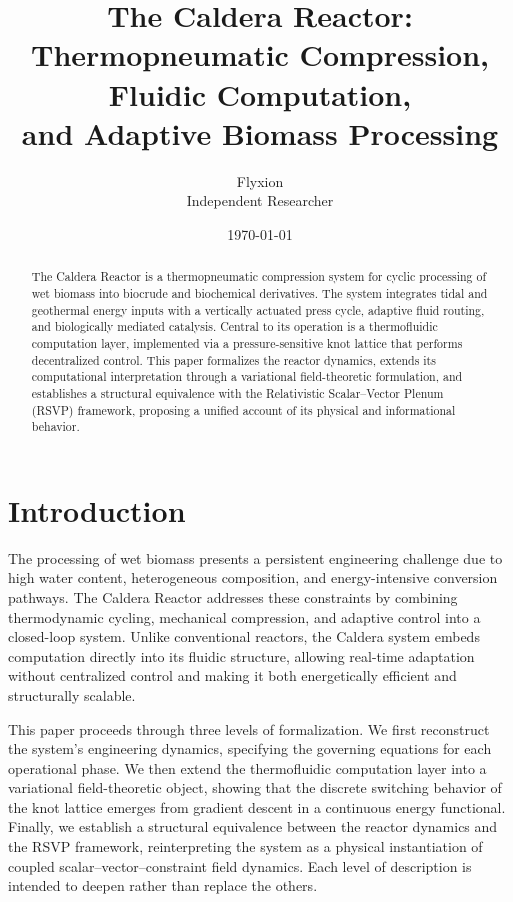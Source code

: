 \documentclass[12pt, a4paper]{article}
\title{\large\textbf{The Caldera Reactor:\\
Thermopneumatic Compression, Fluidic Computation,\\
and Adaptive Biomass Processing}}
\author{Flyxion\\
\small Independent Researcher}
\date{\today}
\begin{document}
\maketitle

\begin{abstract}
The Caldera Reactor is a thermopneumatic compression system for cyclic processing of wet biomass into biocrude and biochemical derivatives. The system integrates tidal and geothermal energy inputs with a vertically actuated press cycle, adaptive fluid routing, and biologically mediated catalysis. Central to its operation is a thermofluidic computation layer, implemented via a pressure-sensitive knot lattice that performs decentralized control. This paper formalizes the reactor dynamics, extends its computational interpretation through a variational field-theoretic formulation, and establishes a structural equivalence with the Relativistic Scalar--Vector Plenum (RSVP) framework, proposing a unified account of its physical and informational behavior.
\end{abstract}

\section{Introduction}

The processing of wet biomass presents a persistent engineering challenge due to high water content, heterogeneous composition, and energy-intensive conversion pathways. The Caldera Reactor addresses these constraints by combining thermodynamic cycling, mechanical compression, and adaptive control into a closed-loop system. Unlike conventional reactors, the Caldera system embeds computation directly into its fluidic structure, allowing real-time adaptation without centralized control and making it both energetically efficient and structurally scalable.

This paper proceeds through three levels of formalization. We first reconstruct the system's engineering dynamics, specifying the governing equations for each operational phase. We then extend the thermofluidic computation layer into a variational field-theoretic object, showing that the discrete switching behavior of the knot lattice emerges from gradient descent in a continuous energy functional. Finally, we establish a structural equivalence between the reactor dynamics and the RSVP framework, reinterpreting the system as a physical instantiation of coupled scalar--vector--constraint field dynamics. Each level of description is intended to deepen rather than replace the others.
\end{document}
